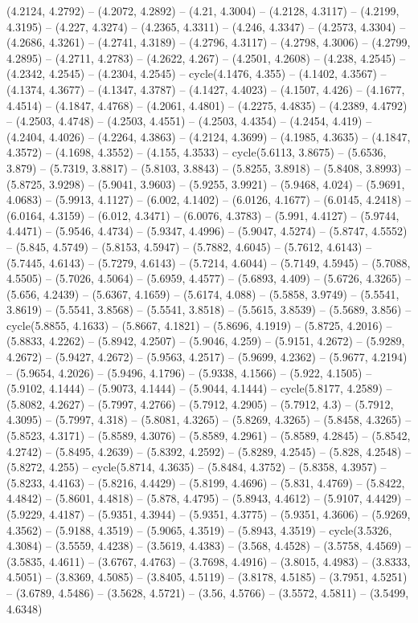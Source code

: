 (4.2124, 4.2792) -- (4.2072, 4.2892) -- (4.21, 4.3004) -- (4.2128, 4.3117) -- (4.2199, 4.3195) -- (4.227, 4.3274) -- (4.2365, 4.3311) -- (4.246, 4.3347) -- (4.2573, 4.3304) -- (4.2686, 4.3261) -- (4.2741, 4.3189) -- (4.2796, 4.3117) -- (4.2798, 4.3006) -- (4.2799, 4.2895) -- (4.2711, 4.2783) -- (4.2622, 4.267) -- (4.2501, 4.2608) -- (4.238, 4.2545) -- (4.2342, 4.2545) -- (4.2304, 4.2545) -- cycle(4.1476, 4.355) -- (4.1402, 4.3567) -- (4.1374, 4.3677) -- (4.1347, 4.3787) -- (4.1427, 4.4023) -- (4.1507, 4.426) -- (4.1677, 4.4514) -- (4.1847, 4.4768) -- (4.2061, 4.4801) -- (4.2275, 4.4835) -- (4.2389, 4.4792) -- (4.2503, 4.4748) -- (4.2503, 4.4551) -- (4.2503, 4.4354) -- (4.2454, 4.419) -- (4.2404, 4.4026) -- (4.2264, 4.3863) -- (4.2124, 4.3699) -- (4.1985, 4.3635) -- (4.1847, 4.3572) -- (4.1698, 4.3552) -- (4.155, 4.3533) -- cycle(5.6113, 3.8675) -- (5.6536, 3.879) -- (5.7319, 3.8817) -- (5.8103, 3.8843) -- (5.8255, 3.8918) -- (5.8408, 3.8993) -- (5.8725, 3.9298) -- (5.9041, 3.9603) -- (5.9255, 3.9921) -- (5.9468, 4.024) -- (5.9691, 4.0683) -- (5.9913, 4.1127) -- (6.002, 4.1402) -- (6.0126, 4.1677) -- (6.0145, 4.2418) -- (6.0164, 4.3159) -- (6.012, 4.3471) -- (6.0076, 4.3783) -- (5.991, 4.4127) -- (5.9744, 4.4471) -- (5.9546, 4.4734) -- (5.9347, 4.4996) -- (5.9047, 4.5274) -- (5.8747, 4.5552) -- (5.845, 4.5749) -- (5.8153, 4.5947) -- (5.7882, 4.6045) -- (5.7612, 4.6143) -- (5.7445, 4.6143) -- (5.7279, 4.6143) -- (5.7214, 4.6044) -- (5.7149, 4.5945) -- (5.7088, 4.5505) -- (5.7026, 4.5064) -- (5.6959, 4.4577) -- (5.6893, 4.409) -- (5.6726, 4.3265) -- (5.656, 4.2439) -- (5.6367, 4.1659) -- (5.6174, 4.088) -- (5.5858, 3.9749) -- (5.5541, 3.8619) -- (5.5541, 3.8568) -- (5.5541, 3.8518) -- (5.5615, 3.8539) -- (5.5689, 3.856) -- cycle(5.8855, 4.1633) -- (5.8667, 4.1821) -- (5.8696, 4.1919) -- (5.8725, 4.2016) -- (5.8833, 4.2262) -- (5.8942, 4.2507) -- (5.9046, 4.259) -- (5.9151, 4.2672) -- (5.9289, 4.2672) -- (5.9427, 4.2672) -- (5.9563, 4.2517) -- (5.9699, 4.2362) -- (5.9677, 4.2194) -- (5.9654, 4.2026) -- (5.9496, 4.1796) -- (5.9338, 4.1566) -- (5.922, 4.1505) -- (5.9102, 4.1444) -- (5.9073, 4.1444) -- (5.9044, 4.1444) -- cycle(5.8177, 4.2589) -- (5.8082, 4.2627) -- (5.7997, 4.2766) -- (5.7912, 4.2905) -- (5.7912, 4.3) -- (5.7912, 4.3095) -- (5.7997, 4.318) -- (5.8081, 4.3265) -- (5.8269, 4.3265) -- (5.8458, 4.3265) -- (5.8523, 4.3171) -- (5.8589, 4.3076) -- (5.8589, 4.2961) -- (5.8589, 4.2845) -- (5.8542, 4.2742) -- (5.8495, 4.2639) -- (5.8392, 4.2592) -- (5.8289, 4.2545) -- (5.828, 4.2548) -- (5.8272, 4.255) -- cycle(5.8714, 4.3635) -- (5.8484, 4.3752) -- (5.8358, 4.3957) -- (5.8233, 4.4163) -- (5.8216, 4.4429) -- (5.8199, 4.4696) -- (5.831, 4.4769) -- (5.8422, 4.4842) -- (5.8601, 4.4818) -- (5.878, 4.4795) -- (5.8943, 4.4612) -- (5.9107, 4.4429) -- (5.9229, 4.4187) -- (5.9351, 4.3944) -- (5.9351, 4.3775) -- (5.9351, 4.3606) -- (5.9269, 4.3562) -- (5.9188, 4.3519) -- (5.9065, 4.3519) -- (5.8943, 4.3519) -- cycle(3.5326, 4.3084) -- (3.5559, 4.4238) -- (3.5619, 4.4383) -- (3.568, 4.4528) -- (3.5758, 4.4569) -- (3.5835, 4.4611) -- (3.6767, 4.4763) -- (3.7698, 4.4916) -- (3.8015, 4.4983) -- (3.8333, 4.5051) -- (3.8369, 4.5085) -- (3.8405, 4.5119) -- (3.8178, 4.5185) -- (3.7951, 4.5251) -- (3.6789, 4.5486) -- (3.5628, 4.5721) -- (3.56, 4.5766) -- (3.5572, 4.5811) -- (3.5499, 4.6348) 